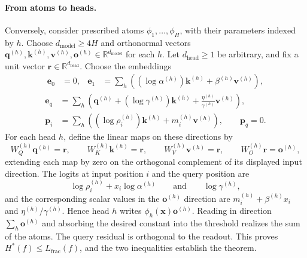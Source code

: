 \documentclass{article}
\theoremstyle{definition}
\theoremstyle{plain}
\newcommand{\hstar}{H^{\ast}}
\begin{document}
\paragraph{From atoms to heads.}
Conversely, consider prescribed atoms $\phi_1,\ldots,\phi_H$, with their parameters indexed by $h$. Choose $d_{\mathrm{model}}\geq4H$ and orthonormal vectors $\mathbf{q}^{(h)},\mathbf{k}^{(h)},\mathbf{v}^{(h)},\mathbf{o}^{(h)}\in\mathbb{R}^{d_{\mathrm{model}}}$ for each $h$. Let $d_{\mathrm{head}}\geq1$ be arbitrary, and fix a unit vector $\mathbf{r}\in\mathbb{R}^{d_{\mathrm{head}}}$. Choose the embeddings
\begin{align}
\mathbf{e}_0&=0,
&
\mathbf{e}_1&=\sum_h\left((\log\alpha^{(h)})\mathbf{k}^{(h)}
+\beta^{(h)}\mathbf{v}^{(h)}\right),
\label{eq:normal-token-embeddings}
\end{align}
\begin{equation}
\begin{aligned}
\mathbf{e}_q&=\sum_h\left(\mathbf{q}^{(h)}
+(\log\gamma^{(h)})\mathbf{k}^{(h)}
+\frac{\eta^{(h)}}{\gamma^{(h)}}\mathbf{v}^{(h)}\right),
\\
\mathbf{p}_i&=\sum_h\left((\log\rho_i^{(h)})\mathbf{k}^{(h)}
+m_i^{(h)}\mathbf{v}^{(h)}\right),
\qquad \mathbf{p}_q=0.
\end{aligned}
\label{eq:normal-position-embeddings}
\end{equation}
For each head $h$, define the linear maps on these directions by
\begin{equation}
W_Q^{(h)}\mathbf{q}^{(h)}=\mathbf{r},
\qquad
W_K^{(h)}\mathbf{k}^{(h)}=\mathbf{r},
\qquad
W_V^{(h)}\mathbf{v}^{(h)}=\mathbf{r},
\qquad
W_O^{(h)}\mathbf{r}=\mathbf{o}^{(h)},
\label{eq:normal-projection-construction}
\end{equation}
extending each map by zero on the orthogonal complement of its displayed input direction. The logits at input position $i$ and the query position are
\begin{equation}
\log\rho_i^{(h)}+x_i\log\alpha^{(h)}
\qquad\text{and}\qquad
\log\gamma^{(h)},
\end{equation}
and the corresponding scalar values in the $\mathbf{o}^{(h)}$ direction are $m_i^{(h)}+\beta^{(h)}x_i$ and $\eta^{(h)}/\gamma^{(h)}$. Hence head $h$ writes $\phi_h(\mathbf{x})\mathbf{o}^{(h)}$. Reading in direction $\sum_h\mathbf{o}^{(h)}$ and absorbing the desired constant into the threshold realizes the sum of the atoms. The query residual is orthogonal to the readout. This proves $\hstar(f)\leq L_{\mathrm{frac}}(f)$, and the two inequalities establish the theorem.
\end{document}
